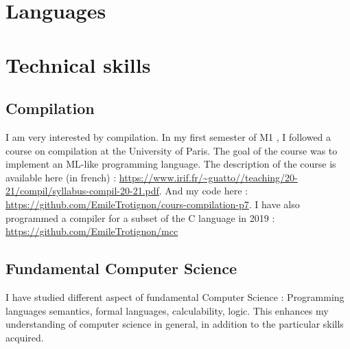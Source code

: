 \documentclass[10pt, a4paper, roman, french]{moderncv}
\begin{document}
	 
	 
	 

	\section{Languages}
		
		
		
	\section{Technical skills}
	
		\subsection{Compilation}
			I am very interested by compilation. In my first semester of M1 , I followed a course on compilation at the University of Paris. The goal of the course was to implement an ML-like programming language.
The description of the course is available here (in french) : \url{https://www.irif.fr/~guatto//teaching/20-21/compil/syllabus-compil-20-21.pdf}.
And my code here : \url{https://github.com/EmileTrotignon/cours-compilation-p7}.
I have also programmed a compiler for a subset of the C language in 2019 : \url{https://github.com/EmileTrotignon/mcc}
	
		\subsection{Fundamental Computer Science}
			I have studied different aspect of fundamental Computer Science :
Programming languages semantics, formal languages, calculability, logic.
This enhances my understanding of computer science in general, in addition to the particular skills acquired.
	
\end{document}

